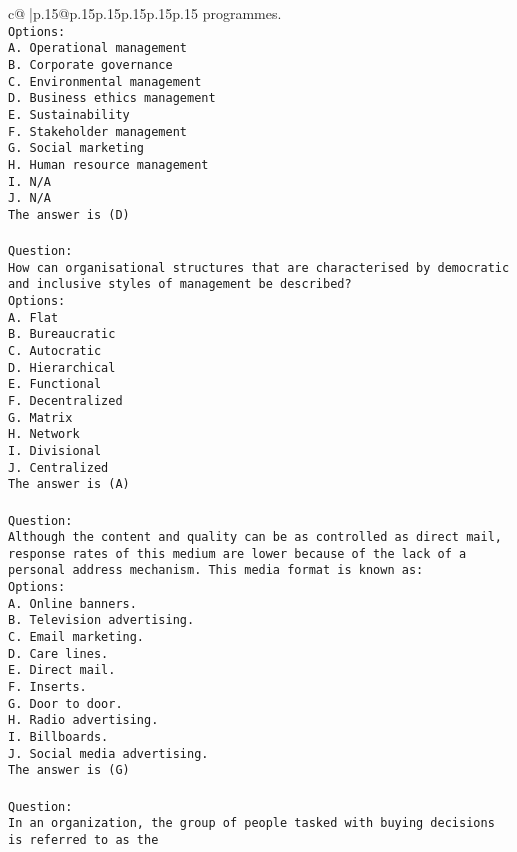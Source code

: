 \documentclass{article}
\begin{document}
{\begin{supertabular}{c@{$\;$}|p{.15\linewidth}@{}p{.15\linewidth}p{.15\linewidth}p{.15\linewidth}p{.15\linewidth}p{.15\linewidth}}
{{{programmes.\\ \tt Options:\\ \tt A. Operational management\\ \tt B. Corporate governance\\ \tt C. Environmental management\\ \tt D. Business ethics management\\ \tt E. Sustainability\\ \tt F. Stakeholder management\\ \tt G. Social marketing\\ \tt H. Human resource management\\ \tt I. N/A\\ \tt J. N/A\\ \tt The answer is (D)\\ \tt \\ \tt Question:\\ \tt How can organisational structures that are characterised by democratic and inclusive styles of management be described?\\ \tt Options:\\ \tt A. Flat\\ \tt B. Bureaucratic\\ \tt C. Autocratic\\ \tt D. Hierarchical\\ \tt E. Functional\\ \tt F. Decentralized\\ \tt G. Matrix\\ \tt H. Network\\ \tt I. Divisional\\ \tt J. Centralized\\ \tt The answer is (A)\\ \tt \\ \tt Question:\\ \tt Although the content and quality can be as controlled as direct mail, response rates of this medium are lower because of the lack of a personal address mechanism. This media format is known as:\\ \tt Options:\\ \tt A. Online banners.\\ \tt B. Television advertising.\\ \tt C. Email marketing.\\ \tt D. Care lines.\\ \tt E. Direct mail.\\ \tt F. Inserts.\\ \tt G. Door to door.\\ \tt H. Radio advertising.\\ \tt I. Billboards.\\ \tt J. Social media advertising.\\ \tt The answer is (G)\\ \tt \\ \tt Question:\\ \tt In an organization, the group of people tasked with buying decisions is referred to as the }}}
\end{supertabular}}
\end{document}

